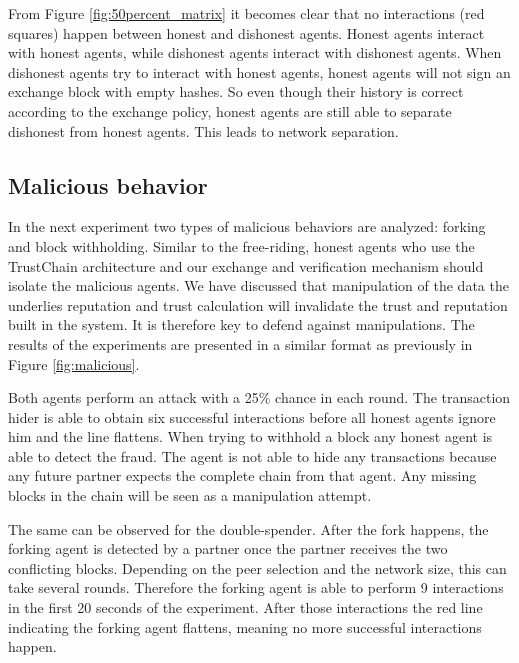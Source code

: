 From Figure \ref{fig:50percent_matrix} it becomes clear that no interactions (red squares) happen 
between honest and dishonest agents. Honest agents interact with honest agents, while dishonest
agents interact with dishonest agents. When dishonest agents try to interact with honest agents, 
honest agents will not sign an exchange block with empty hashes. So even though their history is 
correct according to the exchange policy, honest agents are still able to separate dishonest from
honest agents. This leads to network separation.

\subsection{Malicious behavior}
In the next experiment two types of malicious behaviors are analyzed: forking and block withholding. 
Similar to the free-riding, honest agents who use the TrustChain architecture and our exchange and 
verification mechanism should isolate the malicious agents. We have discussed that manipulation of 
the data the underlies reputation and trust calculation will invalidate the trust and reputation 
built in the system. It is therefore key to defend against manipulations.
The results of the experiments are 
presented in a similar format as previously in Figure \ref{fig:malicious}.

Both agents perform an attack with a 25\% chance in each round.
The transaction hider is able to obtain six successful interactions before all honest agents ignore him and the line flattens. When trying to withhold a block any honest agent is able to detect the fraud. The agent is not able to hide any transactions because any future partner expects the complete chain from that agent. Any missing blocks in the chain will be seen as a manipulation attempt.

The same can be observed for the double-spender. After the fork happens, the forking agent is detected by a partner 
once the partner receives the two conflicting blocks. Depending on the peer selection and the network size, this can 
take several rounds. Therefore the forking agent is able to perform 9 interactions in the first 20 
seconds of the experiment. After those interactions the red line indicating the forking agent 
flattens, meaning no more successful interactions happen. 

